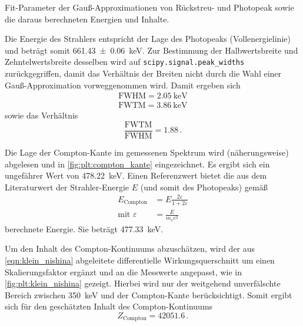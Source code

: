 \begin{table}
    \centering
    \caption{
        Fit-Parameter der Gauß-Approximationen von Rückstreu- und Photopeak
        sowie die daraus berechneten Energien und Inhalte.
    }
    \label{tab:3_Cs_137}
\end{table}

Die Energie des Strahlers entspricht der Lage des Photopeaks (Vollenergielinie)
und beträgt somit \SI{661.43 \pm 0.06}{\kilo\electronvolt}.
Zur Bestimmung der Halbwertsbreite und Zehntelwertsbreite desselben
wird auf \texttt{scipy.signal.peak\_widths} zurückgegriffen,
damit das Verhältnis der Breiten nicht durch die Wahl einer Gauß-Approximation vorweggenommen wird.
Damit ergeben sich
\begin{align*}
    \text{FWHM} = \SI{2.05}{\kilo\electronvolt} \\
    \text{FWTM} = \SI{3.86}{\kilo\electronvolt}
\end{align*}
sowie das Verhältnis
\begin{equation*}
    \frac{\text{FWTM}}{\text{FWHM}} = \num{1.88} \, .
\end{equation*}



Die Lage der Compton-Kante im gemessenen Spektrum wird
    (näherungsweise)
abgelesen
und in \autoref{fig:plt:compton_kante} eingezeichnet.
Es ergibt sich ein ungefährer Wert von \SI{478.22}{\kilo\electronvolt}.
Einen Referenzwert bietet die aus dem Literaturwert der Strahler-Energie $E$ (und somit des Photopeaks) \cite{lara}
gemäß
\begin{align*}
    E_\text{Compton} &= E \frac{2ε}{1 + 2ε} \\
    \text{mit } ε &= \frac{E}{m_e c^2}
\end{align*}
berechnete Energie.
Sie beträgt \SI{477.33}{\kilo\electronvolt}.

Um den Inhalt des Compton-Kontinuums abzuschätzen,
wird der aus \autoref{eqn:klein_nishina} abgeleitete differentielle Wirkungsquerschnitt
um einen Skalierungsfaktor ergänzt und
an die Messwerte angepasst,
    wie in \autoref{fig:plt:klein_nishina} gezeigt.
Hierbei wird nur der weitgehend unverfälschte Bereich zwischen \SI{350}{\kilo\electronvolt} und der Compton-Kante berücksichtigt.
Somit ergibt sich für den geschätzten Inhalt des Compton-Kontinuums
\begin{equation*}
    Z_\text{Compton} = \num{42051.6} \, .
\end{equation*}

